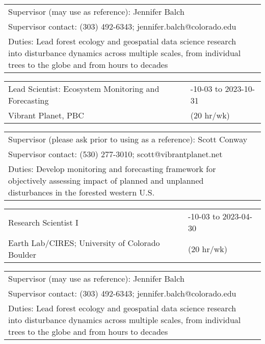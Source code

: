 \documentclass[10pt,english]{article}
\providecommand{\tabularnewline}{\\}
\begin{document}
\renewcommand{\arraystretch}{1.2}
\begin{tabularx}{\textwidth}{@{}>{\raggedright}p{6.25in} >{\raggedleft}X@{}}
\addtolength{\leftskip}{5ex}Supervisor (may use as reference): Jennifer Balch \tabularnewline
\addtolength{\leftskip}{5ex}Supervisor contact: (303) 492-6343; jennifer.balch@colorado.edu \tabularnewline
\addtolength{\leftskip}{5ex}Duties: Lead forest ecology and geospatial data science research into disturbance dynamics across multiple scales, from individual trees to the globe and from hours to decades \tabularnewline
\end{tabularx}

\renewcommand{\arraystretch}{1.2}
\begin{tabularx}{\textwidth}{@{}>{\raggedright}p{4.5in} >{\raggedleft}X@{}}
Lead Scientist: Ecosystem Monitoring and Forecasting & 2022-10-03 to 2023-10-31 \tabularnewline
Vibrant Planet, PBC & (20 hr/wk) \tabularnewline
\end{tabularx}

\renewcommand{\arraystretch}{1.2}
\begin{tabularx}{\textwidth}{@{}>{\raggedright}p{6.25in} >{\raggedleft}X@{}}
\addtolength{\leftskip}{5ex}Supervisor (please ask prior to using as a reference): Scott Conway \tabularnewline
\addtolength{\leftskip}{5ex}Supervisor contact: (530) 277-3010; scott@vibrantplanet.net \tabularnewline
\addtolength{\leftskip}{5ex}Duties: Develop monitoring and forecasting framework for objectively assessing impact of planned and unplanned disturbances in the forested western U.S. \tabularnewline
\end{tabularx}

\renewcommand{\arraystretch}{1.2}
\begin{tabularx}{\textwidth}{@{}>{\raggedright}p{4.5in} >{\raggedleft}X@{}}
Research Scientist I & 2022-10-03 to 2023-04-30 \tabularnewline
Earth Lab/CIRES; University of Colorado Boulder & (20 hr/wk) \tabularnewline
\end{tabularx}

\renewcommand{\arraystretch}{1.2}
\begin{tabularx}{\textwidth}{@{}>{\raggedright}p{6.25in} >{\raggedleft}X@{}}
\addtolength{\leftskip}{5ex}Supervisor (may use as reference): Jennifer Balch \tabularnewline
\addtolength{\leftskip}{5ex}Supervisor contact: (303) 492-6343; jennifer.balch@colorado.edu \tabularnewline
\addtolength{\leftskip}{5ex}Duties: Lead forest ecology and geospatial data science research into disturbance dynamics across multiple scales, from individual trees to the globe and from hours to decades \tabularnewline
\end{tabularx}
\end{document}

